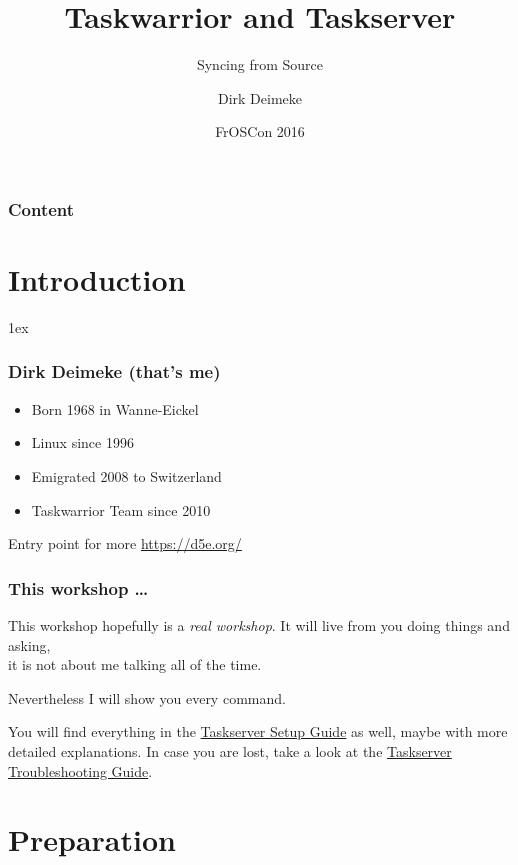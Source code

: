 \documentclass[t,handout]{beamer}
\title{Taskwarrior and Taskserver}
\subtitle{Syncing from Source}
\author[Deimeke, Dirk]{Dirk Deimeke}
\institute[Taskwarrior academy]{Taskwarrior academy}
\date{FrOSCon 2016}
\begin{document}
\begin{frame} %
	\titlepage
\end{frame}


\begin{frame}\frametitle{Content}
	\tableofcontents
\end{frame}

\section{Introduction}

\parskip1ex

\begin{frame}[fragile]\frametitle{Dirk Deimeke (that's me)}
    \vfill
    \begin{itemize}
        \item Born 1968 in Wanne-Eickel
        \item Linux since 1996
        \item Emigrated 2008 to Switzerland
        \item Taskwarrior Team since 2010
    \end{itemize}

    Entry point for more \url{https://d5e.org/}
\end{frame}

\begin{frame}[fragile]\frametitle{This workshop \ldots}
    \vfill
    \begin{alertblock}{This workshop hopefully is a \textit{real workshop}.}
        It will live from you doing things and asking, \\
        it is not about me talking all of the time.
    \end{alertblock}

    {\tiny Nevertheless I will show you every command.}

    You will find everything in the \href{https://git.tasktools.org/projects/ST/repos/guides/browse/taskserver-setup}{Taskserver Setup Guide} as well, maybe with more detailed explanations. In case you are lost, take a look at the \href{https://git.tasktools.org/projects/ST/repos/guides/browse/taskserver-troubleshooting}{Taskserver Troubleshooting Guide}.
\end{frame}

\section{Preparation}
\end{document}
